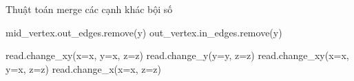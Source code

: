\documentclass[10pt]{beamer}
\theoremstyle{remark}
\numberwithin{algocf}{section}
\numberwithin{equation}{section}
\numberwithin{dl}{section}
\numberwithin{figure}{section}
\begin{document}
\begin{frame}{Thuật toán merge các cạnh khác bội số}
{\begin{minipage}{2\linewidth}
\begin{algorithm}[H]
                     {
                         {
                        mid\_vertex.out\_edges.remove(y)\;
                        }
                         {
                            out\_vertex.in\_edges.remove(y)\;
                        }
                    }

                     {
                        read.change\_xy(x=x, y=x, z=z)\;
                        read.change\_y(y=y, z=z)\;
                    }  {
                        read.change\_xy(x=x, y=x, z=z)\;
                        read.change\_x(x=x, z=z)\;
                    } 
                    
                    \;
                    \caption{MERGE\_MUL}
                \end{algorithm}
            \end{minipage}
        }
    \endgroup
\end{frame}
\end{document}
